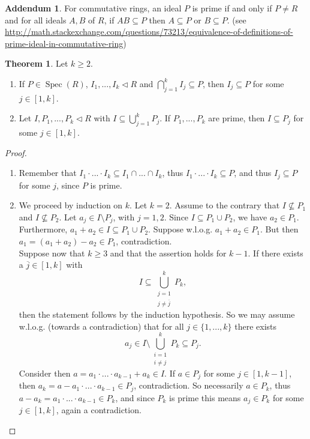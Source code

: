 \documentclass[12pt,a4paper]{report}
\theoremstyle{definition}
\newtheorem{theorem}{Theorem}[chapter] %
\newtheorem*{addendum}{Addendum}
\theoremstyle{num.custom-title}
\DeclareMathOperator{\sm}{\setminus}
\DeclareMathOperator{\sse}{\subseteq}
\DeclareMathOperator{\Spec}{Spec}
\newcommand{\ol}{\overline}
\begin{document}
\begin{addendum}
For commutative rings, an ideal $P$ is prime if and only if $P\neq R$ and for all ideals $A,B$ of $R$, if $AB\subseteq P$ then $A \sse P$ or $B \sse P$. (see \url{http://math.stackexchange.com/questions/73213/equivalence-of-definitions-of-prime-ideal-in-commutative-ring})
\end{addendum}

\begin{theorem}
Let $k \geq 2$.
\begin{enumerate}
\item If $P \in \Spec(R)$, $I_1,...,I_k \lhd R$ and $\bigcap_{j=1}^k I_j \sse P$, then $I_j \sse P$ for some $j \in [1,k]$.
\item Let $I,P_1,...,P_k \lhd R$ with $I \sse \bigcup_{j=1}^k P_j$. If $P_1,...,P_k$ are prime, then $I \sse P_j$ for some $j \in [1,k]$.
\end{enumerate}
\begin{proof}\ 
\begin{enumerate}
\item Remember that $I_1 \cdot ... \cdot I_k \sse I_1 \cap ... \cap I_k$, thus $I_1 \cdot ... \cdot I_k \sse P$, and thus $I_j \sse P$ for some $j$, since $P$ is prime.
\item We proceed by induction on $k$. Let $k=2$. Assume to the contrary that $I \nsubseteq P_1$ and $I \nsubseteq P_2$. Let $a_j \in I \sm P_j$, with $j=1,2$. Since $I \sse P_1 \cup P_2$, we have $a_2 \in P_1$. Furthermore, $a_1+a_2 \in I \sse P_1 \cup P_2$. Suppose w.l.o.g. $a_1+a_2 \in P_1$. But then $a_1=(a_1+a_2)-a_2 \in P_1$, contradiction.\\
Suppose now that $k \geq 3$ and that the assertion holds for $k-1$. If there exists a $\ol{j} \in [1,k]$ with 
\[
I \sse \bigcup_{\substack{j=1\\ j \neq \ol{j}}}^k P_k,
\]
then the statement follows by the induction hypothesis. So we may assume w.l.o.g. (towards a contradiction) that for all $j \in \{1,...,k\}$ there exists 
\[
a_j \in I \sm \bigcup_{\substack{i=1\\ i \neq j}}^k P_k \sse P_j.
\]
Consider then $a=a_1 \cdot ... \cdot a_{k-1} + a_k \in I$. If $a \in P_j$ for some $j \in [1,k-1]$, then $a_k=a-a_1 \cdot ... \cdot a_{k-1} \in P_j$, contradiction. So necessarily $a \in P_k$, thus $a-a_k=a_1 \cdot ... \cdot a_{k-1} \in P_k$, and since $P_k$ is prime this means $a_j \in P_k$ for some $j \in [1,k]$, again a contradiction.
\end{enumerate}
\end{proof}
\end{theorem}
\end{document}
